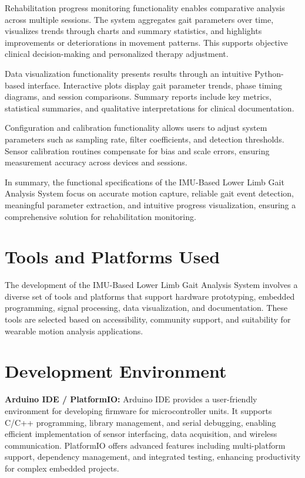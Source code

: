 \documentclass[12pt,a4paper]{report}
\begin{document}
Rehabilitation progress monitoring functionality enables comparative analysis across multiple sessions. The system aggregates gait parameters over time, visualizes trends through charts and summary statistics, and highlights improvements or deteriorations in movement patterns. This supports objective clinical decision-making and personalized therapy adjustment.

Data visualization functionality presents results through an intuitive Python-based interface. Interactive plots display gait parameter trends, phase timing diagrams, and session comparisons. Summary reports include key metrics, statistical summaries, and qualitative interpretations for clinical documentation.

Configuration and calibration functionality allows users to adjust system parameters such as sampling rate, filter coefficients, and detection thresholds. Sensor calibration routines compensate for bias and scale errors, ensuring measurement accuracy across devices and sessions.

In summary, the functional specifications of the IMU-Based Lower Limb Gait Analysis System focus on accurate motion capture, reliable gait event detection, meaningful parameter extraction, and intuitive progress visualization, ensuring a comprehensive solution for rehabilitation monitoring.

\newpage
\section{Tools and Platforms Used}

The development of the IMU-Based Lower Limb Gait Analysis System involves a diverse set of tools and platforms that support hardware prototyping, embedded programming, signal processing, data visualization, and documentation. These tools are selected based on accessibility, community support, and suitability for wearable motion analysis applications.

\section{Development Environment}

\textbf{Arduino IDE / PlatformIO:}  
Arduino IDE provides a user-friendly environment for developing firmware for microcontroller units. It supports C/C++ programming, library management, and serial debugging, enabling efficient implementation of sensor interfacing, data acquisition, and wireless communication. PlatformIO offers advanced features including multi-platform support, dependency management, and integrated testing, enhancing productivity for complex embedded projects.
\end{document}
